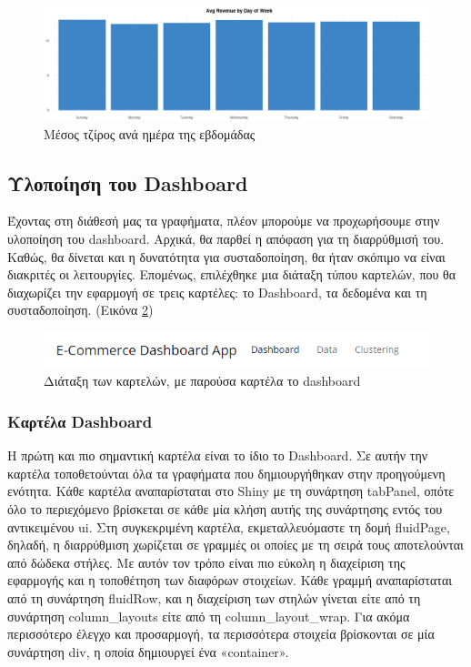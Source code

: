 \documentclass{article}
\begin{document}
\begin{figure}[h]
    \centering
    \includegraphics[width=\textwidth]{pictures/5_timebar_graph.png}
    \caption{Μέσος τζίρος ανά ημέρα της εβδομάδας}
    \label{fig:5}
\end{figure}

\subsection{Υλοποίηση του Dashboard}

Έχοντας στη διάθεσή μας τα γραφήματα, πλέον μπορούμε να προχωρήσουμε στην υλοποίηση του dashboard. Αρχικά, θα παρθεί η απόφαση για τη διαρρύθμισή του. Καθώς, θα δίνεται και η δυνατότητα για συσταδοποίηση, θα ήταν σκόπιμο να είναι διακριτές οι λειτουργίες. Επομένως, επιλέχθηκε μια διάταξη τύπου καρτελών, που θα διαχωρίζει την εφαρμογή σε τρεις καρτέλες: το Dashboard, τα δεδομένα και τη συσταδοποίηση. (Εικόνα \ref{fig:6})

\begin{figure}[h]
    \centering
    \includegraphics[width=\textwidth]{pictures/6_navbar.png}
    \caption{Διάταξη των καρτελών, με παρούσα καρτέλα το dashboard}
    \label{fig:6}
\end{figure}

\subsubsection{Καρτέλα Dashboard}

Η πρώτη και πιο σημαντική καρτέλα είναι το ίδιο το Dashboard. Σε αυτήν την καρτέλα τοποθετούνται όλα τα γραφήματα που δημιουργήθηκαν στην προηγούμενη ενότητα. Κάθε καρτέλα αναπαρίσταται στο Shiny με τη συνάρτηση tabPanel, οπότε όλο το περιεχόμενο βρίσκεται σε κάθε μία κλήση αυτής της συνάρτησης εντός του αντικειμένου ui. Στη συγκεκριμένη καρτέλα, εκμεταλλευόμαστε τη δομή fluidPage, δηλαδή, η διαρρύθμιση χωρίζεται σε γραμμές οι οποίες με τη σειρά τους αποτελούνται από δώδεκα στήλες. Με αυτόν τον τρόπο είναι πιο εύκολη η διαχείριση της εφαρμογής και η τοποθέτηση των διαφόρων στοιχείων. Κάθε γραμμή αναπαρίσταται από τη συνάρτηση fluidRow, και η διαχείριση των στηλών γίνεται είτε από τη συνάρτηση column\_layouts είτε από τη column\_layout\_wrap. Για ακόμα περισσότερο έλεγχο και προσαρμογή, τα περισσότερα στοιχεία βρίσκονται σε μία συνάρτηση div, η οποία δημιουργεί ένα «container».
\end{document}
